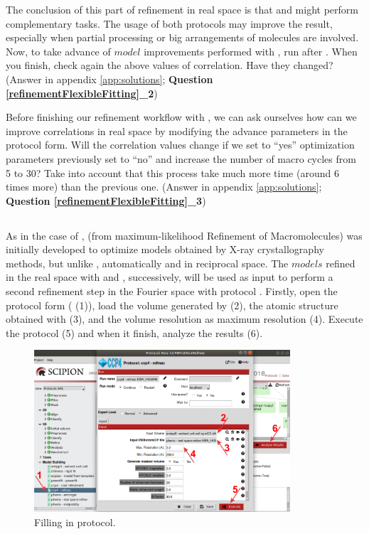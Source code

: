   The conclusion of this part of refinement in real space is that \coot and \phenix {} might perform complementary tasks. The usage of both protocols may improve the result, especially when partial processing or big arrangements of molecules are involved. Now, to take advance of $model$ improvements performed with \coot, run \phenix {} after \coot. When you finish, check again the above values of correlation. Have they changed? (Answer in appendix \ref{app:solutions}; \textbf{Question \ref{refinementFlexibleFitting}\_2})
  
  Before finishing our refinement workflow with , we can ask ourselves how can we improve correlations in real space by modifying the advance parameters in the protocol form. Will the correlation values change if we set to ``yes'' optimization parameters previously set to ``no'' and increase the number of macro cycles from 5 to 30? Take into account that this process take much more time (around 6 times more) than the previous one. (Answer in appendix \ref{app:solutions}; \textbf{Question \ref{refinementFlexibleFitting}\_3})\\
  
  \subsection*{  }
  
  As in the case of \coot,  (from maximum-likelihood Refinement of Macromolecules) was initially developed to optimize models obtained by X-ray crystallography methods, but unlike \coot, automatically and in reciprocal space. The $models$ refined in the real space with \coot and \phenix {}, successively, will be used as input to perform a second refinement step in the Fourier space with  protocol . Firstly, open the  protocol form ( (1)), load the volume generated by \coot (2), the atomic structure obtained with \phenix {} (3), and the volume resolution as maximum resolution (4). Execute the protocol (5) and when it finish, analyze the results (6).
  
  \begin{figure}[H]
  \centering 
  \captionsetup{width=.7\linewidth} 
  \includegraphics[width=0.85\textwidth]{Images/Fig31}
  \caption{Filling in  protocol.}
  \label{fig:refmac_protocol}
  \end{figure}
  
